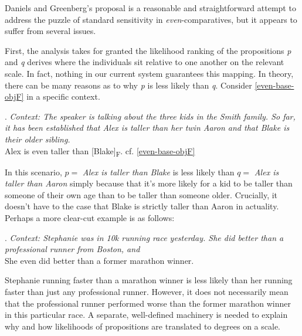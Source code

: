 \documentclass[12pt,letterpaper]{scrartcl}
\newcommand{\alignright}{\hspace*{\fill}}
\newcommand{\sub}[1]{\textsubscript{#1}}
\begin{document}
Daniels and Greenberg's proposal is a reasonable and straightforward attempt to address the puzzle of standard sensitivity in \textit{even}-comparatives, but it appears to suffer from several issues. 

First, the analysis takes for granted the likelihood ranking of the propositions \textit{p} and \textit{q} derives where the individuals sit relative to one another on the relevant scale. In fact, nothing in our current system guarantees this mapping. In theory, there can be many reasons as to why \textit{p} is less likely than \textit{q}. Consider \ref{even-base-objF} in a specific context.

\ex. \label{sibling} \textit{Context: The speaker is talking about the three kids in the Smith family. So far, it has been established that Alex is taller than her twin Aaron and that Blake is their older sibling.} \\
Alex is even taller than [Blake]\sub{F}. \alignright cf. \ref{even-base-objF}

In this scenario, $p =$ \textit{Alex is taller than Blake} is less likely than $q =$ \textit{Alex is taller than Aaron} simply because that it's more likely for a kid to be taller than someone of their own age than to be taller than someone older. Crucially, it doesn't have to the case that Blake is strictly taller than Aaron in actuality. Perhaps a more clear-cut example is as follows:

\ex. \textit{Context: Stephanie was in 10k running race yesterday. She did better than a professional runner from Boston, and} \\ She even did better than a former marathon winner.

Stephanie running faster than a marathon winner is less likely than her running faster than just any professional runner. However, it does not necessarily mean that the professional runner performed worse than the former marathon winner in this particular race. %
A separate, well-defined machinery is needed to explain why and how likelihoods of propositions are translated to degrees on a scale.
\end{document}
